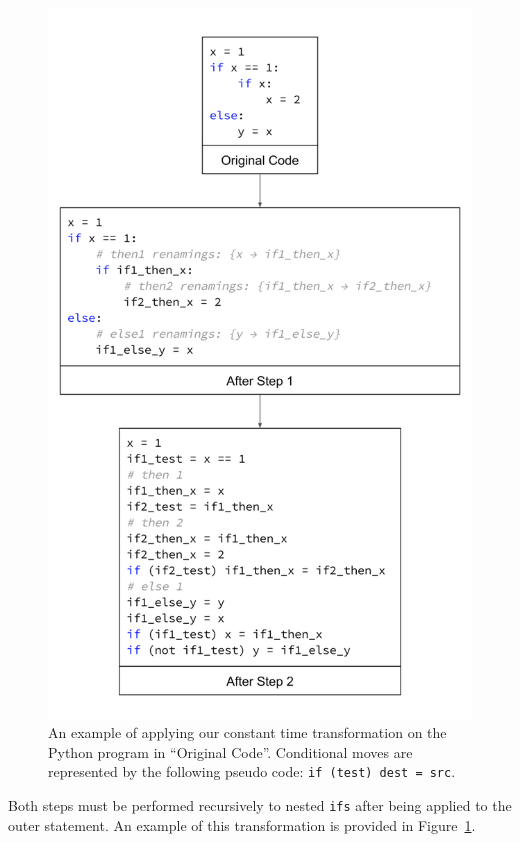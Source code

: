 \documentclass[sigplan, review]{acmart}
\begin{document}
\begin{figure}[bhp]
\includegraphics[width=\columnwidth]{cmov_if_transofrmation.png}
\caption{An example of applying our constant time transformation on the Python program in ``Original Code''. Conditional moves are represented by the following pseudo code: \texttt{if (test) dest = src}.}
\label{fig:cmov_if_transofrmation}
\end{figure}

Both steps must be performed recursively to nested \texttt{ifs} after being applied to the outer statement. An example of this transformation is provided in Figure~\ref{fig:cmov_if_transofrmation}.
\end{document}
